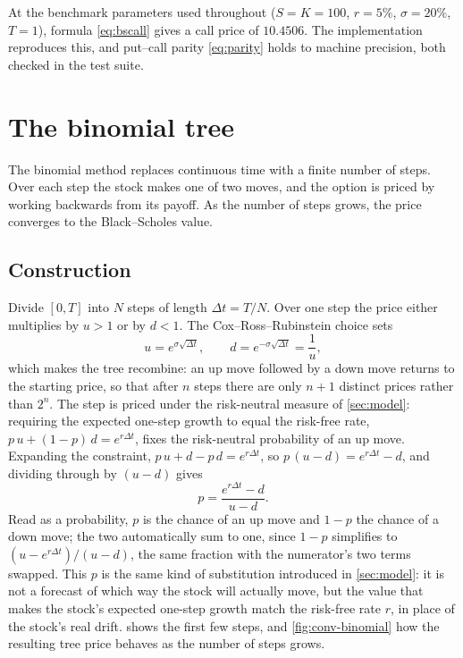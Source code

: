 \documentclass[11pt,a4paper]{article}
\numberwithin{equation}{section}
\theoremstyle{definition}
\theoremstyle{plain}
\theoremstyle{remark}
\begin{document}
At the benchmark parameters used throughout ($S = K = 100$, $r = 5\%$,
$\sigma = 20\%$, $T = 1$), formula \eqref{eq:bscall} gives a call price of
$10.4506$. The implementation reproduces this, and put--call parity
\eqref{eq:parity} holds to machine precision, both checked in the test suite.

\section{The binomial tree}\label{sec:binomial}

The binomial method replaces continuous time with a finite number of steps. Over
each step the stock makes one of two moves, and the option is priced by working
backwards from its payoff. As the number of steps grows, the price converges to
the Black--Scholes value.

\subsection{Construction}

Divide $[0,T]$ into $N$ steps of length $\Delta t = T/N$. Over one step the price
either multiplies by $u > 1$ or by $d < 1$. The Cox--Ross--Rubinstein choice
\cite{crr} sets
\begin{equation}\label{eq:crr-ud}
  u = e^{\sigma\sqrt{\Delta t}}, \qquad d = e^{-\sigma\sqrt{\Delta t}} = \frac{1}{u},
\end{equation}
which makes the tree recombine: an up move followed by a down move returns to
the starting price, so that after $n$ steps there are only $n+1$ distinct prices
rather than $2^n$. The step is priced under the risk-neutral measure of
\cref{sec:model}: requiring the expected one-step growth to equal the risk-free
rate, $p\,u + (1-p)\,d = e^{r\Delta t}$, fixes the risk-neutral probability of an
up move. Expanding the constraint, $p\,u + d - p\,d = e^{r\Delta t}$, so
$p\,(u-d) = e^{r\Delta t} - d$, and dividing through by $(u-d)$ gives
\begin{equation}\label{eq:crr-p}
  p = \frac{e^{r\Delta t} - d}{u - d}.
\end{equation}
Read as a probability, $p$ is the chance of an up move and $1-p$ the chance of
a down move; the two automatically sum to one, since $1-p$ simplifies to
$(u - e^{r\Delta t})/(u-d)$, the same fraction with the numerator's two terms
swapped. This $p$ is the same kind of substitution introduced in
\cref{sec:model}: it
is not a forecast of which way the stock will actually move, but the value
that makes the stock's expected one-step growth match the risk-free rate $r$,
in place of the stock's real drift.
 shows the first few steps, and \cref{fig:conv-binomial} how the
resulting tree price behaves as the number of steps grows.
\end{document}
